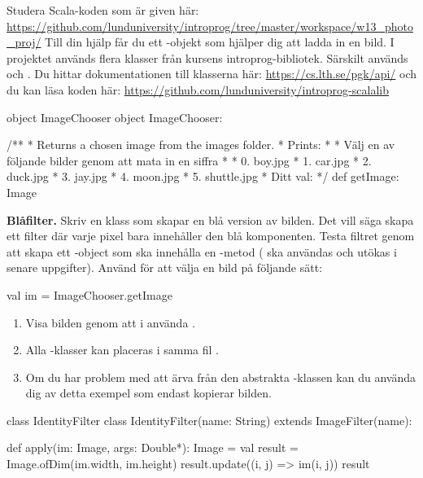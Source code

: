 Studera Scala-koden som är given här: \url{https://github.com/lunduniversity/introprog/tree/master/workspace/w13_photo_proj/}
Till din hjälp får du ett -objekt som hjälper dig att ladda in en bild. 
I projektet används flera klasser från kursens introprog-bibliotek. Särskilt används  och .
Du hittar dokumentationen till klasserna här: \url{https://cs.lth.se/pgk/api/} och du kan läsa koden här: \url{https://github.com/lunduniversity/introprog-scalalib}

\begin{ScalaSpec}{object ImageChooser}
	object ImageChooser:

		/**
		* Returns a chosen image from the images folder.
		* Prints:	
		*
		*	Välj en av följande bilder genom att mata in en siffra
		*
		*	0. boy.jpg
		*	1. car.jpg
		*	2. duck.jpg
		*	3. jay.jpg
		*	4. moon.jpg
		*	5. shuttle.jpg
		*	Ditt val: 
		*/
		def getImage: Image
\end{ScalaSpec}


\Task \textbf{Blåfilter.} Skriv en klass  som skapar en blå version av bilden. 
Det vill säga skapa ett filter där varje pixel bara innehåller den blå komponenten. 
Testa filtret genom att skapa ett -object som ska innehålla en 
-metod ( ska användas och utökas i senare uppgifter). 
Använd  för att välja en bild på följande sätt:
\begin{Code}
	val im = ImageChooser.getImage
\end{Code}
\begin{enumerate}
	\item Visa bilden genom att i  använda . 
	\item Alla -klasser kan placeras i samma fil .
	\item Om du har problem med att ärva från den abstrakta -klassen kan du använda dig av detta exempel som endast kopierar bilden.
\end{enumerate}
\begin{ScalaSpec}{class IdentityFilter}
	class IdentityFilter(name: String) extends ImageFilter(name):
	
		def apply(im: Image, args: Double*): Image = 
			val result = Image.ofDim(im.width, im.height)
			result.update((i, j) => im(i, j))
			result
\end{ScalaSpec}



